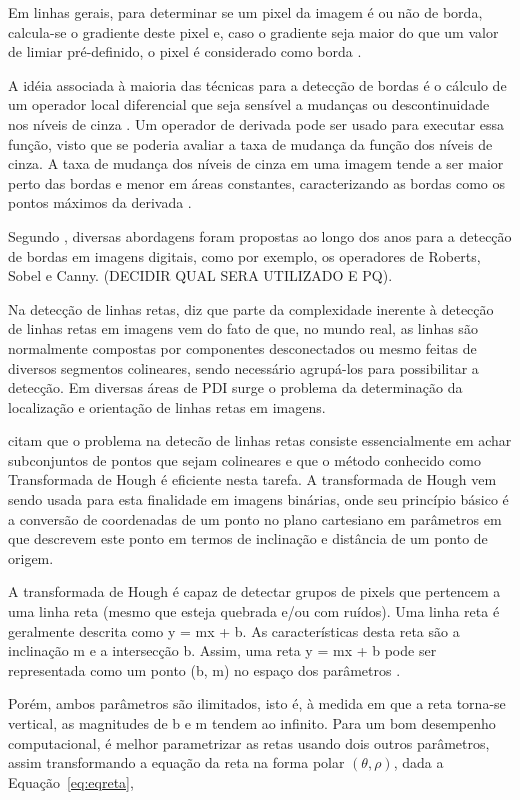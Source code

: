 Em linhas gerais, para determinar se um pixel da imagem é ou não de borda, calcula-se o gradiente deste pixel e, caso o gradiente seja maior do que um valor de limiar pré-definido, o pixel é considerado como borda \cite{Silva2001}.

A idéia associada à maioria das técnicas para a detecção de bordas é o cálculo de um operador local diferencial que seja sensível a mudanças ou descontinuidade nos níveis de cinza \cite{GONZALEZ2002}. Um operador de derivada pode ser usado para executar essa função, visto que se poderia avaliar a taxa de mudança da função dos níveis de cinza. A taxa de mudança dos níveis de cinza em uma imagem tende a ser maior perto das bordas e menor em áreas constantes, caracterizando as bordas como os pontos máximos da derivada \cite{PEDRINI2008}.

Segundo , diversas abordagens foram propostas ao longo dos anos para a detecção de bordas em imagens digitais, como por exemplo, os operadores de Roberts, Sobel e Canny. (DECIDIR QUAL SERA UTILIZADO E PQ).

Na detecção de linhas retas,  diz que parte da complexidade inerente à detecção de linhas retas em imagens vem do fato de que, no mundo real, as linhas são normalmente compostas por componentes desconectados ou mesmo feitas de diversos segmentos colineares, sendo necessário agrupá-los para possibilitar a detecção. Em diversas áreas de PDI surge o problema da determinação da localização e orientação de linhas retas em imagens.

 citam que o problema na detecão de linhas retas consiste essencialmente em achar subconjuntos de pontos que sejam colineares e que o método conhecido como Transformada de Hough é eficiente nesta tarefa. A transformada de Hough vem sendo usada para esta finalidade em imagens binárias, onde seu princípio básico é a conversão de coordenadas de um ponto no plano cartesiano em parâmetros em que descrevem este ponto em termos de inclinação e distância de um ponto de origem.


A transformada de Hough é capaz de detectar grupos de pixels que pertencem a uma linha reta (mesmo que esteja quebrada e/ou com ruídos). Uma linha reta é geralmente descrita como y = mx + b. As características desta reta são a inclinação m e a intersecção b. Assim, uma reta y = mx + b pode ser representada como um ponto (b, m) no espaço dos parâmetros \cite{HOUGHKIM}. 

Porém, ambos parâmetros são ilimitados, isto é, à medida em que a reta torna-se vertical, as magnitudes de b e m tendem ao infinito. Para um bom desempenho computacional, é melhor parametrizar as retas usando dois outros parâmetros, assim transformando a equação da reta na forma polar $(\theta, \rho)$, dada a Equação~\ref{eq:eqreta},

